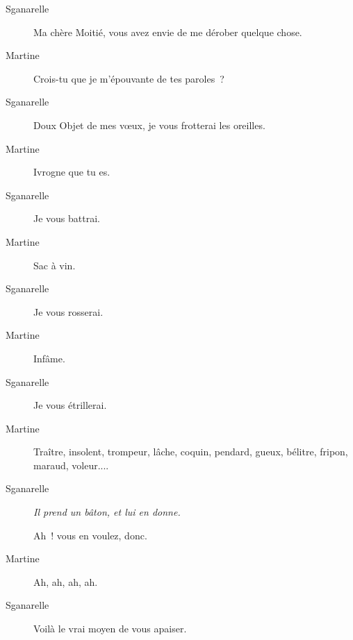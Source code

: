 \documentclass[french,twoside]{book} %
\begin{document}
 \begin{description} \item[Sganarelle] 

Ma chère Moitié, vous avez envie de me dérober quelque chose.\end{description}
 \begin{description} \item[Martine] 

Crois-tu que je m’épouvante de tes paroles ?\end{description}
 \begin{description} \item[Sganarelle] 

Doux Objet de mes vœux, je vous frotterai les oreilles.\end{description}
 \begin{description} \item[Martine] 

Ivrogne que tu es.\end{description}
 \begin{description} \item[Sganarelle] 

Je vous battrai.\end{description}
 \begin{description} \item[Martine] 

Sac à vin.\end{description}
 \begin{description} \item[Sganarelle] 

Je vous rosserai.\end{description}
 \begin{description} \item[Martine] 

Infâme.\end{description}
 \begin{description} \item[Sganarelle] 

Je vous étrillerai.\end{description}
 \begin{description} \item[Martine] 

Traître, insolent, trompeur, lâche, coquin, pendard, gueux, bélitre, fripon, maraud, voleur....\end{description}
 \begin{description} \item[Sganarelle] \textit{Il prend un bâton, et lui en donne.} 

Ah ! vous en voulez, donc.\end{description}
 \begin{description} \item[Martine] 

Ah, ah, ah, ah.\end{description}
 \begin{description} \item[Sganarelle] 

Voilà le vrai moyen de vous apaiser.\end{description}
\end{document}
